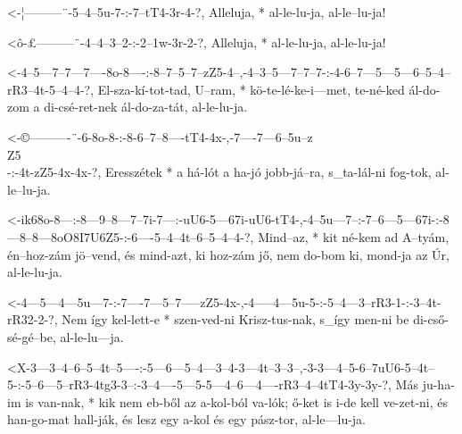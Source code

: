   {<-¦---------¨-5--4--5u-7-:-7--tT4-3r-4-?,}
  {  Alleluja, * al-le-lu-ja, al-le--lu-ja!}

  {<ô-£---------¨-4--4--3--2-:-2--1w-3r-2-?,}
  {   Alleluja, * al-le-lu-ja, al-le-lu-ja!}




  {<-4--5---7--7---7----8o-8----:-8--7--5--7--zZ5-4--,-4--3--5---7--7--7-:-4-6--7---5---5---6--5--4--rR3--4t-5--4--4-?,}
  {  El-sza-kí-tot-tad, U--ram, * kö-te-lé-ke-i---met, te-né-ked ál-do-zom a di-csé-ret-nek ál-do-za-tát, al-le-lu-ja.}


  {<-©----------¨-6-8o-8-:-8-6--7--8----tT4-4x-,-7----7---6--5u--z\\Z5\\-:-4t-zZ5-4x-4x-?,}
  {  Eresszétek * a há-lót a ha-jó jobb-já--ra,  s_ta-lál-ni fog-tok,      al-le--lu-ja.}


  {<-ik68o-8---:-8---9--8---7--7i-7---:-uU6-5---67i-uU6-tT4-,-4--5u---7--:-7--6---5---67i-:-8---8--8---8oO8I7U6Z5-:-6----5--4--4t--6--5--4--4-?,}
  {  Mind--az, * kit né-kem ad A--tyám, én--hoz-zám jö--vend, és mind-azt, ki hoz-zám jő,   nem do-bom ki,          mond-ja az Úr, al-le-lu-ja.}




  {<-4---5---4---5u---7-:-7----7---5--7-----zZ5-4x-,-4-----4---5u-5-:-5--4---3--rR3-1-:-3--4t-rR32-2-?,}
  {  Nem így kel-lett-e * szen-ved-ni Krisz-tus-nak, s_így men-ni be  di-cső-sé-gé--be, al-le-lu---ja.}


  {<X-3---3--4--6--5--4t--5----:-5---6---5--4---3--4-3---4t--3--3--,-3-3---4--5-6--7uU6-5--4t--5-:-5--6---5--rR3-4tg3-3--:-3--4----5---5-5---4--6---4----rR3--4--4tT4-3y-3y-?,}
  {   Más ju-ha-im is van-nak, * kik nem eb-ből az a-kol-ból va-lók; ő-ket is i-de kell ve-zet-ni, és han-go-mat hall-ják, és lesz egy a-kol és egy pász-tor, al-le---lu-ja.}


